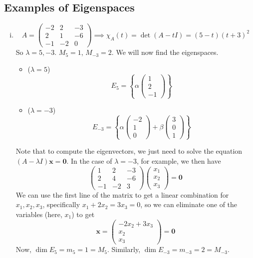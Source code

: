 \documentclass{article}
\begin{document}
\subsection{Examples of Eigenspaces}
\begin{enumerate}[(i)]
	\item
	      \[ A = \begin{pmatrix}
			      -2 & 2 & -3 \\ 2 & 1 & -6 \\ -1 & -2 & 0
		      \end{pmatrix} \implies \chi_A(t) = \det(A - tI) = (5-t)(t+3)^2 \]
	      So $\lambda = 5, -3$. $M_5 = 1$, $M_{-3} = 2$. We will now find the eigenspaces.
	      \begin{itemize}
		      \item ($\lambda = 5$)
		            \[ E_5 = \left\{ \alpha\begin{pmatrix}
				            1 \\ 2 \\ -1
			            \end{pmatrix} \right\} \]
		      \item ($\lambda = -3$)
		            \[ E_{-3} = \left\{ \alpha\begin{pmatrix}
				            -2 \\ 1 \\ 0
			            \end{pmatrix} + \beta\begin{pmatrix}
				            3 \\ 0 \\ 1
			            \end{pmatrix} \right\} \]
	      \end{itemize}
	      Note that to compute the eigenvectors, we just need to solve the equation $(A - \lambda I)\bm x = \bm 0$. In the case of $\lambda = -3$, for example, we then have
	      \[ \begin{pmatrix}
			      1 & 2 & -3 \\ 2 & 4 & -6 \\ -1 & -2 & 3
		      \end{pmatrix} \begin{pmatrix}
			      x_1 \\ x_2 \\ x_3
		      \end{pmatrix} = \bm 0 \]
	      We can use the first line of the matrix to get a linear combination for $x_1, x_2, x_3$, specifically $x_1 + 2x_2 = 3x_3 = 0$, so we can eliminate one of the variables (here, $x_1$) to get
	      \[ \bm x = \begin{pmatrix}
			      -2x_2 + 3x_3 \\ x_2 \\ x_3
		      \end{pmatrix} = \bm 0 \]
	      Now, $\dim E_5 = m_5 = 1 = M_5$. Similarly, $\dim E_{-3} = m_{-3} = 2 = M_{-3}$.


\end{enumerate}
\end{document}
